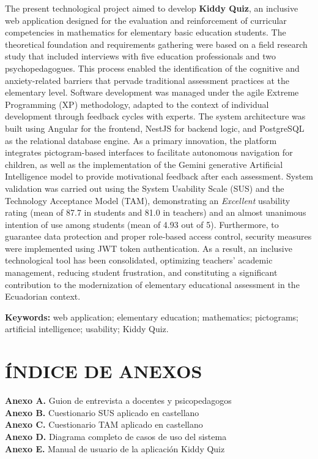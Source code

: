 \documentclass[12pt,a4paper,oneside]{report}
\begin{document}
The present technological project aimed to develop \textbf{Kiddy Quiz}, an inclusive web application designed for the evaluation and reinforcement of curricular competencies in mathematics for elementary basic education students. The theoretical foundation and requirements gathering were based on a field research study that included interviews with five education professionals and two psychopedagogues. This process enabled the identification of the cognitive and anxiety-related barriers that pervade traditional assessment practices at the elementary level. Software development was managed under the agile Extreme Programming (XP) methodology, adapted to the context of individual development through feedback cycles with experts. The system architecture was built using Angular for the frontend, NestJS for backend logic, and PostgreSQL as the relational database engine. As a primary innovation, the platform integrates pictogram-based interfaces to facilitate autonomous navigation for children, as well as the implementation of the Gemini generative Artificial Intelligence model to provide motivational feedback after each assessment. System validation was carried out using the System Usability Scale (SUS) and the Technology Acceptance Model (TAM), demonstrating an \textit{Excellent} usability rating (mean of 87.7 in students and 81.0 in teachers) and an almost unanimous intention of use among students (mean of 4.93 out of 5). Furthermore, to guarantee data protection and proper role-based access control, security measures were implemented using JWT token authentication. As a result, an inclusive technological tool has been consolidated, optimizing teachers' academic management, reducing student frustration, and constituting a significant contribution to the modernization of elementary educational assessment in the Ecuadorian context.

\vspace{0.4cm}
\noindent\textbf{Keywords:} web application; elementary education; mathematics; pictograms; artificial intelligence; usability; Kiddy Quiz.

\clearpage

\tableofcontents
\clearpage

\listoftables
\clearpage

\listoffigures
\clearpage

\chapter*{ÍNDICE DE ANEXOS}
\noindent
\textbf{Anexo A.} Guion de entrevista a docentes y psicopedagogos\\[2pt]
\textbf{Anexo B.} Cuestionario SUS aplicado en castellano\\[2pt]
\textbf{Anexo C.} Cuestionario TAM aplicado en castellano\\[2pt]
\textbf{Anexo D.} Diagrama completo de casos de uso del sistema\\[2pt]
\textbf{Anexo E.} Manual de usuario de la aplicación Kiddy Quiz
\clearpage
\end{document}
